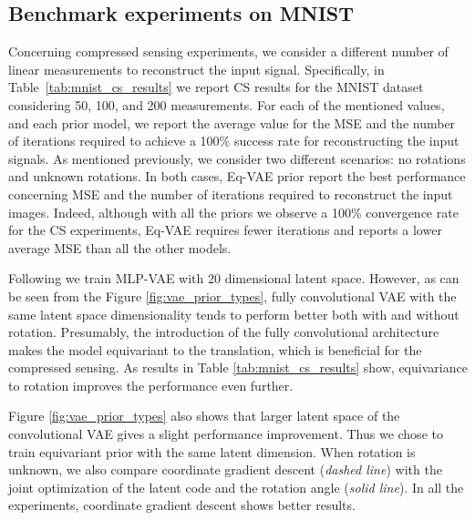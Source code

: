 \subsection{Benchmark experiments on MNIST}
Concerning compressed sensing experiments, we consider a different number of linear measurements to reconstruct the input signal. Specifically, in Table~\ref{tab:mnist_cs_results} we report CS results for the MNIST dataset considering 50, 100, and 200 measurements. For each of the mentioned values, and each prior model, we report the average value for the MSE and the number of iterations required to achieve a 100\% success rate for reconstructing the input signals.
As mentioned previously, we consider two different scenarios: no rotations and unknown rotations. In both cases, Eq-VAE prior report the best performance concerning MSE and the number of iterations required to reconstruct the input images.
Indeed, although with all the priors we observe a 100\% convergence rate for the CS experiments, Eq-VAE requires fewer iterations and reports a lower average MSE than all the other models.

Following \cite{Bora2017-as} we train MLP-VAE with 20 dimensional latent space. However, as can be seen from the Figure \ref{fig:vae_prior_types}, fully convolutional VAE with the same latent space dimensionality tends to perform better both with and without rotation. Presumably, the introduction of the fully convolutional architecture makes the model equivariant to the translation, which is beneficial for the compressed sensing. As results in Table \ref{tab:mnist_cs_results} show, equivariance to rotation improves the performance even further. 

Figure \ref{fig:vae_prior_types} also shows that larger latent space of the convolutional VAE gives a slight performance improvement. Thus we chose to train equivariant prior with the same latent dimension. When rotation is unknown, we also compare coordinate gradient descent (\textit{dashed line}) with the joint optimization of the latent code and the rotation angle (\textit{solid line}). In all the experiments, coordinate gradient descent shows better results.




